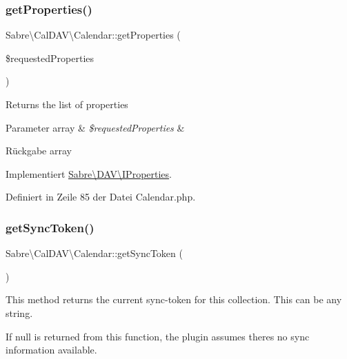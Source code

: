\subsubsection{\texorpdfstring{get\+Properties()}{getProperties()}}
{\footnotesize\ttfamily Sabre\textbackslash{}\+Cal\+D\+A\+V\textbackslash{}\+Calendar\+::get\+Properties (\begin{DoxyParamCaption}\item[{}]{\$requested\+Properties }\end{DoxyParamCaption})}

Returns the list of properties


\begin{DoxyParams}[1]{Parameter}
array & {\em \$requested\+Properties} & \\
\hline
\end{DoxyParams}
\begin{DoxyReturn}{Rückgabe}
array 
\end{DoxyReturn}


Implementiert \mbox{\hyperlink{interface_sabre_1_1_d_a_v_1_1_i_properties_a0d2fcaacf74daaa5cf24ea53a057140a}{Sabre\textbackslash{}\+D\+A\+V\textbackslash{}\+I\+Properties}}.



Definiert in Zeile 85 der Datei Calendar.\+php.

\mbox{\label{class_sabre_1_1_cal_d_a_v_1_1_calendar_a74fa64b6484a0cd7f3300d89a96d74d9}} 
\subsubsection{\texorpdfstring{get\+Sync\+Token()}{getSyncToken()}}
{\footnotesize\ttfamily Sabre\textbackslash{}\+Cal\+D\+A\+V\textbackslash{}\+Calendar\+::get\+Sync\+Token (\begin{DoxyParamCaption}{ }\end{DoxyParamCaption})}

This method returns the current sync-\/token for this collection. This can be any string.

If null is returned from this function, the plugin assumes there\textquotesingle{}s no sync information available.

